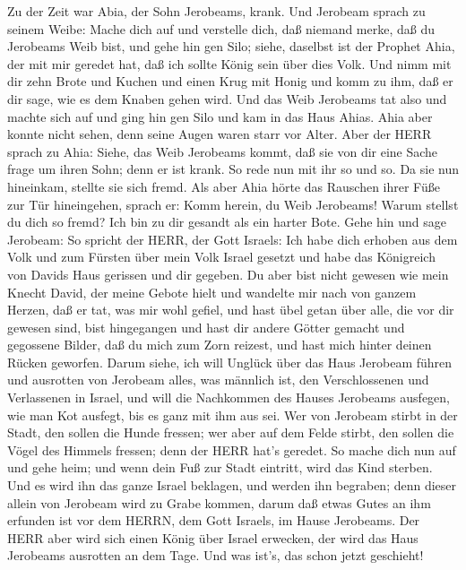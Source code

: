 Zu der Zeit war Abia, der Sohn Jerobeams, krank.
 Und Jerobeam sprach zu seinem Weibe: Mache dich auf und
verstelle dich, daß niemand merke, daß du Jerobeams Weib bist, und gehe
hin gen Silo; siehe, daselbst ist der Prophet Ahia, der mit mir geredet
hat, daß ich sollte König sein über dies Volk.  Und nimm mit
dir zehn Brote und Kuchen und einen Krug mit Honig und komm zu ihm, daß
er dir sage, wie es dem Knaben gehen wird.  Und das Weib
Jerobeams tat also und machte sich auf und ging hin gen Silo und kam in
das Haus Ahias. Ahia aber konnte nicht sehen, denn seine Augen waren
starr vor Alter.  Aber der HERR sprach zu Ahia: Siehe, das
Weib Jerobeams kommt, daß sie von dir eine Sache frage um ihren Sohn;
denn er ist krank. So rede nun mit ihr so und so. Da sie nun hineinkam,
stellte sie sich fremd.  Als aber Ahia hörte das Rauschen
ihrer Füße zur Tür hineingehen, sprach er: Komm herein, du Weib
Jerobeams! Warum stellst du dich so fremd? Ich bin zu dir gesandt als
ein harter Bote.  Gehe hin und sage Jerobeam: So spricht der
HERR, der Gott Israels: Ich habe dich erhoben aus dem Volk und zum
Fürsten über mein Volk Israel gesetzt  und habe das
Königreich von Davids Haus gerissen und dir gegeben. Du aber bist nicht
gewesen wie mein Knecht David, der meine Gebote hielt und wandelte mir
nach von ganzem Herzen, daß er tat, was mir wohl gefiel, 
und hast übel getan über alle, die vor dir gewesen sind, bist
hingegangen und hast dir andere Götter gemacht und gegossene Bilder, daß
du mich zum Zorn reizest, und hast mich hinter deinen Rücken geworfen.
 Darum siehe, ich will Unglück über das Haus Jerobeam
führen und ausrotten von Jerobeam alles, was männlich ist, den
Verschlossenen und Verlassenen in Israel, und will die Nachkommen des
Hauses Jerobeams ausfegen, wie man Kot ausfegt, bis es ganz mit ihm aus
sei.  Wer von Jerobeam stirbt in der Stadt, den sollen die
Hunde fressen; wer aber auf dem Felde stirbt, den sollen die Vögel des
Himmels fressen; denn der HERR hat's geredet.  So mache
dich nun auf und gehe heim; und wenn dein Fuß zur Stadt eintritt, wird
das Kind sterben.  Und es wird ihn das ganze Israel
beklagen, und werden ihn begraben; denn dieser allein von Jerobeam wird
zu Grabe kommen, darum daß etwas Gutes an ihm erfunden ist vor dem
HERRN, dem Gott Israels, im Hause Jerobeams.  Der HERR aber
wird sich einen König über Israel erwecken, der wird das Haus Jerobeams
ausrotten an dem Tage. Und was ist's, das schon jetzt geschieht!
